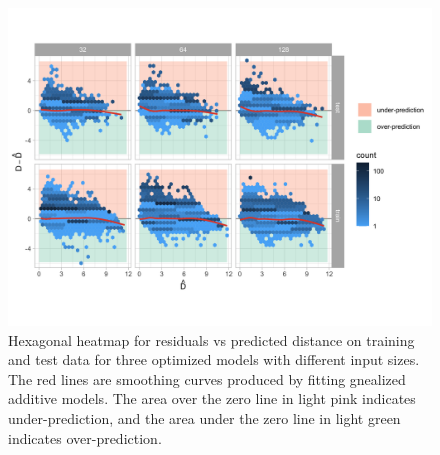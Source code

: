 \documentclass[]{interact}
\theoremstyle{plain}%
\theoremstyle{definition}
\theoremstyle{remark}
\begin{document}
\begin{figure}[!h]

{\centering \includegraphics[width=1\linewidth]{paper_files/figure-latex/model-performance-1} 

}

\caption{Hexagonal heatmap for residuals vs predicted distance on training and test data for three optimized models with different input sizes. The red lines are smoothing curves produced by fitting gnealized additive models. The area over the zero line in light pink indicates under-prediction, and the area under the zero line in light green indicates over-prediction.}\label{fig:model-performance}
\end{figure}
\end{document}

